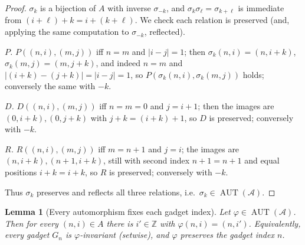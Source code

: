 \documentclass[12pt,fullpage]{article}
\newtheorem{lemma}[theorem]{Lemma}
\theoremstyle{definition}
\newcommand{\A}{\mathcal{A}}
\newcommand{\Z}{{\mathbb{Z}}}
\newcommand{\AUT}{\operatorname{AUT}}
\renewcommand{\phi}{\varphi}
\begin{document}
\begin{proof}
$\sigma_k$ is a bijection of $A$ with inverse $\sigma_{-k}$, and
$\sigma_k\sigma_\ell=\sigma_{k+\ell}$ is immediate from
$(i+\ell)+k=i+(k+\ell)$.  We check each relation is preserved (and, applying
the same computation to $\sigma_{-k}$, reflected).

\emph{$P$.} $P((n,i),(m,j))$ iff $n=m$ and $|i-j|=1$; then
$\sigma_k(n,i)=(n,i+k)$, $\sigma_k(m,j)=(m,j+k)$, and indeed $n=m$ and
$|(i+k)-(j+k)|=|i-j|=1$, so $P(\sigma_k(n,i),\sigma_k(m,j))$ holds; conversely
the same with $-k$.

\emph{$D$.} $D((n,i),(m,j))$ iff $n=m=0$ and $j=i+1$; then the images are
$(0,i+k),(0,j+k)$ with $j+k=(i+k)+1$, so $D$ is preserved; conversely with
$-k$.

\emph{$R$.} $R((n,i),(m,j))$ iff $m=n+1$ and $j=i$; the images are
$(n,i+k),(n+1,i+k)$, still with second index $n+1=n+1$ and equal positions
$i+k=i+k$, so $R$ is preserved; conversely with $-k$.

Thus $\sigma_k$ preserves and reflects all three relations, i.e.\
$\sigma_k\in\AUT(\A)$.
\end{proof}

\begin{lemma}[Every automorphism fixes each gadget index]\label{lem:fix-index}
Let $\phi\in\AUT(\A)$.  Then for every $(n,i)\in A$ there is $i'\in\Z$ with
$\phi(n,i)=(n,i')$.  Equivalently, every gadget $G_n$ is $\phi$-invariant
(setwise), and $\phi$ preserves the gadget index $n$.
\end{lemma}
\end{document}
